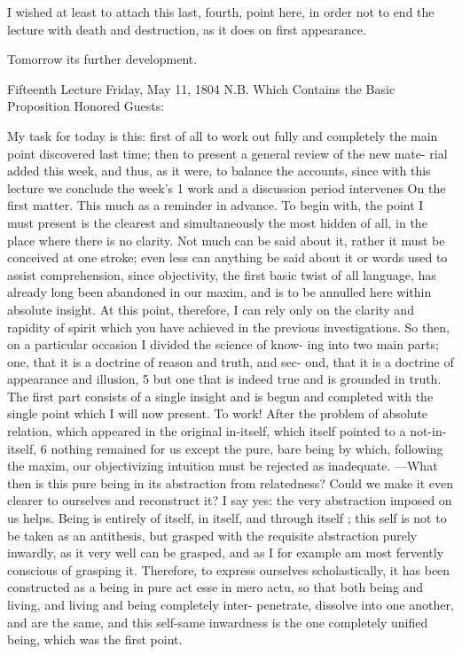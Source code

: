 I wished at least to attach this last, fourth, point here, in order not to
end the lecture with death and destruction, as it does on first appearance.

Tomorrow its further development.

Fifteenth Lecture
Friday, May 11, 1804
N.B. Which Contains the Basic Proposition
Honored Guests:

My task for today is this: first of all to work out fully and completely the main
point discovered last time; then to present a general review of the new mate-
rial added this week, and thus, as it were, to balance the accounts, since with
this lecture we conclude the week’s 1 work and a discussion period intervenes
On the first matter.
This much as a reminder in advance.
To begin with,
the point I must present is the clearest and simultaneously the most hidden of
all, in the place where there is no clarity.
Not much can be said about it, rather
it must be conceived at one stroke;
 even less can anything be said about it or
words used to assist comprehension, since objectivity, the first basic twist of all
language, has already long been abandoned in our maxim, and is to be
annulled here within absolute insight.
At this point, therefore, I can rely only
on the clarity and rapidity of spirit which you have achieved in the previous
investigations.
So then, on a particular occasion I divided the science of know-
ing into two main parts; one, that it is a doctrine of reason and truth, and sec-
ond, that it is a doctrine of appearance and illusion, 5 but one that is indeed true
and is grounded in truth.
The first part consists of a single insight and is begun
and completed with the single point which I will now present.
To work! After
the problem of absolute relation, which appeared in the original in-itself, which
itself pointed to a not-in-itself, 6 nothing remained for us except the pure, bare
being by which, following the maxim, our objectivizing intuition must be
rejected as inadequate.
—What then is this pure being in its abstraction from
relatedness? Could we make it even clearer to ourselves and reconstruct it? I say
yes: the very abstraction imposed on us helps.
Being is entirely of itself, in itself,
and through itself ; this self is not to be taken as an antithesis, but grasped with
the requisite abstraction purely inwardly, as it very well can be grasped, and as
I for example am most fervently conscious of grasping it.
Therefore, to express
ourselves scholastically, it has been constructed as a being in pure act {esse in
mero actu}, so that both being and living, and living and being completely inter-
penetrate, dissolve into one another, and are the same, and this self-same
inwardness is the one completely unified being, which was the first point.


